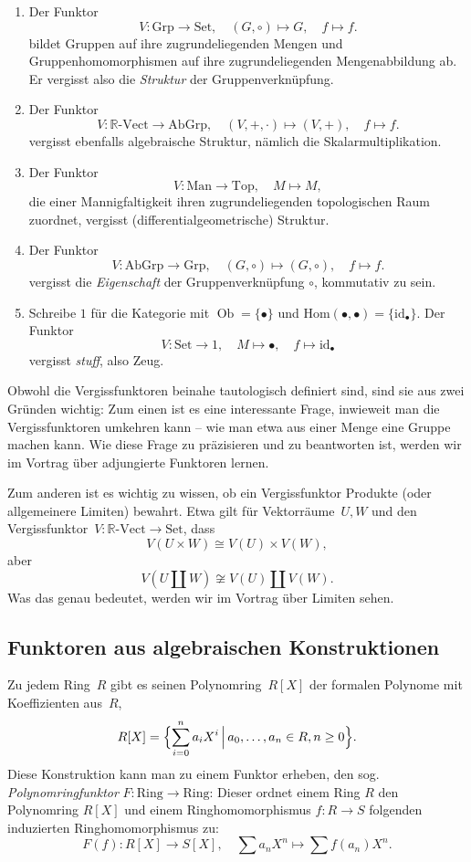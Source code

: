 \documentclass[a4paper,ngerman]{scrartcl}
\theoremstyle{definition}
\theoremstyle{plain}
\theoremstyle{remark}
\newcommand{\RR}{\mathbb{R}}
\newcommand{\Hom}{\mathrm{Hom}}
\newcommand{\id}{\mathrm{id}}
\DeclareMathOperator{\Ob}{Ob}
\newcommand{\Set}{\mathrm{Set}}
\newcommand{\Grp}{\mathrm{Grp}}
\newcommand{\Vect}{\mathrm{Vect}}
\newcommand{\AbGrp}{\mathrm{AbGrp}}
\newcommand{\Ring}{\mathrm{Ring}}
\newcommand{\Man}{\mathrm{Man}}
\newcommand{\Top}{\mathrm{Top}}
\begin{document}
\begin{enumerate}
  \item Der Funktor
  \[ V : \Grp \to \Set, \quad (G,\circ) \mapsto G, \quad f \mapsto f. \]
  bildet Gruppen auf ihre zugrundeliegenden Mengen und Gruppenhomomorphismen
  auf ihre zugrundeliegenden Mengenabbildung ab. Er vergisst also die
  \emph{Struktur} der Gruppenverknüpfung.
  \item Der Funktor
  \[ V : \RR\text{-}\Vect \to \AbGrp, \quad (V,+,\cdot) \mapsto (V,+), \quad f \mapsto f. \]
  vergisst ebenfalls algebraische Struktur, nämlich die Skalarmultiplikation.
  \item Der Funktor
  \[ V : \Man \to \Top, \quad M \mapsto M, \]
  die einer Mannigfaltigkeit ihren zugrundeliegenden topologischen Raum
  zuordnet, vergisst (differentialgeometrische) Struktur.
  \item Der Funktor
  \[ V : \AbGrp \to \Grp, \quad (G,\circ) \mapsto (G,\circ), \quad f \mapsto f. \]
  vergisst die \emph{Eigenschaft} der Gruppenverknüpfung $\circ$, kommutativ zu sein.
  \item Schreibe $1$ für die Kategorie mit $\Ob = \lbrace \bullet \rbrace$ und $\Hom(\bullet,\bullet) = \lbrace \id_\bullet \rbrace$. Der Funktor
  \[ V : \Set \to 1, \quad M \mapsto \bullet, \quad f \mapsto \id_\bullet \]
  vergisst \emph{stuff}, also Zeug.
\end{enumerate}

Obwohl die Vergissfunktoren beinahe tautologisch definiert sind, sind sie aus
zwei Gründen wichtig: Zum einen ist es eine interessante Frage, inwieweit
man die Vergissfunktoren umkehren kann -- wie man etwa aus einer Menge eine
Gruppe machen kann. Wie diese Frage zu präzisieren und zu beantworten ist,
werden wir im Vortrag über adjungierte Funktoren lernen.

Zum anderen ist es wichtig zu wissen, ob ein Vergissfunktor Produkte (oder
allgemeinere Limiten) bewahrt. Etwa gilt für Vektorräume~$U, W$ und den
Vergissfunktor~$V:\RR\text{-}\Vect \to \Set$, dass
\[ V(U \times W) \cong V(U) \times V(W), \]
aber
\[ V(U \coprod W) \not\cong V(U) \coprod V(W). \]
Was das genau bedeutet, werden wir im Vortrag über Limiten sehen.


\subsection{Funktoren aus algebraischen Konstruktionen}

Zu jedem Ring~$R$ gibt es seinen Polynomring~$R[X]$ der formalen Polynome mit
Koeffizienten aus~$R$,
\[ R[X] = \Bigl\{ \sum_{i=0}^n a_i X^i \,\Big|\, a_0,\ldots,a_n \in R, n \geq 0
\Bigr\}. \]
Diese Konstruktion kann man zu einem Funktor erheben, den sog.
\emph{Polynomringfunktor} $F : \Ring \to \Ring$: Dieser ordnet einem Ring $R$
den Polynomring $R[X]$ und einem Ringhomomorphismus $f : R \to S$ folgenden
induzierten Ringhomomorphismus zu:
\[ F(f) : R[X] \to S[X], \quad \sum a_n X^n \mapsto \sum f(a_n) X^n. \]
\end{document}
